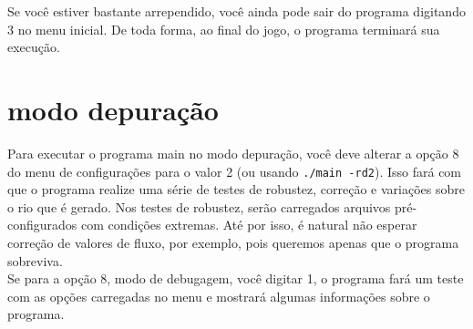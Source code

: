 \documentclass[11pt,a4paper]{article}
\begin{document}
Se você estiver bastante arrependido, você ainda pode sair do programa digitando 3 no menu inicial. De toda forma, ao final do jogo, o programa terminará sua execução.

\section{modo depuração}
Para executar o programa main no modo depuração, você deve alterar a opção 8 do menu de configurações para o valor 2 (ou usando \verb|./main -rd2|). Isso fará com que o programa realize uma série de testes de robustez, correção e variações sobre o rio que é gerado. Nos testes de robustez, serão carregados arquivos pré-configurados com condições extremas. Até por isso, é natural não esperar correção de valores de fluxo, por exemplo, pois queremos apenas que o programa sobreviva. \\

Se para a opção 8, modo de debugagem, você digitar 1, o programa fará um teste com as opções carregadas no menu e mostrará algumas informações sobre o programa. 
\end{document}
